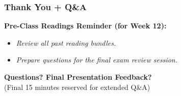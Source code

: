 \documentclass{beamer}
\begin{document}
\begin{frame}[t]
  \frametitle{Thank You + Q\&A}
  
  \textbf{Pre-Class Readings Reminder (for Week 12):}
  \begin{itemize}
      \item \textit{Review all past reading bundles.}
      \item \textit{Prepare questions for the final exam review session.}
  \end{itemize}
  
  \vspace{1cm}
  \begin{center}
      \textbf{Questions? Final Presentation Feedback?} \\
      \small (Final 15 minutes reserved for extended Q\&A)
  \end{center}
\end{frame}
\end{document}

